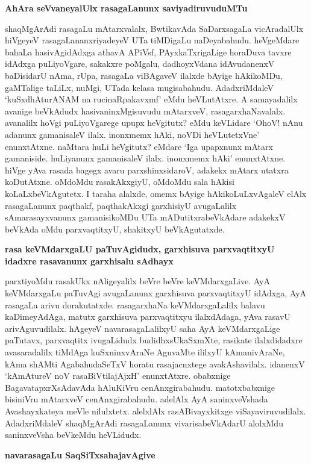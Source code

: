 \noindent
{\bf\large{AhAra seVvaneyalUlx rasagaLanunx saviyadiruvuduMTu}}\label{page221}

shaqMgArAdi rasagaLu mAtarxvalalx, BwtikavAda SaDarxsagaLa vicAradalUlx hiVgeyeV rasagaLananxriyadeyeV UTa tiMDigaLu naDeyabahudu. heVgeMdare bahaLa hasivAgidAdxga athavA APiVsf, PAyxkaTxrigaLige horaDuva tavxre idAdxga puLiyoVgare, sakakxre poMgalu, dadhoyxVdana idAvudanenxV baDisidarU nAma, rUpa, rasagaLa viBAgaveV ilalxde bAyige hAkikoMDu, gaMTalige taLiLx, nuMgi, UTada kelasa mugisabahudu. AdadxriMdaleV `kuSxdhAturANAM na rucinaRpakavxmf'\label{221} eMdu heVLutAtxre. A samayadalilx avanige beVkAdudx hasivaninxMgisuvudu mAtarxveV, rasagarxhaNavalalx. avanalilx hoVgi puLiyoVgarege upupx heVgitutx? eMdu keVLidare `OhoV! nAnu adanunx gamanisaleV ilalx. inonxmemx hAki, noVDi heVLutetxVne' enunxtAtxne. naMtara huLi heVgitutx? eMdare `Iga upapxnunx mAtarx gamaniside. huLiyanunx gamanisaleV ilalx. inonxmemx hAki' enunxtAtxne. hiVge yAva rasada bagegx avaru parxshinxsidaroV, adakekx mAtarx utatxra koDutAtxne. oMdoMdu rasakAkxgiyU, oMdoMdu sala hAkisi koLaLxbeVkAgutetx. I taraha alalxde, omemx bAyige hAkikoLuLxvAgaleV elAlx rasagaLanunx paqthakf, paqthakAkxgi garxhisiyU avugaLalilx sAmarasayxvanunx gamanisikoMDu UTa mADutitxrabeVkAdare adakekxV beVkAda oMdu parxvaqtitxyU, shakitxyU beVkAgutatxde.

\noindent
{\bf\large{rasa keVMdarxgaLU paTuvAgidudx, garxhisuva parxvaqtitxyU idadxre rasavanunx garxhisalu sAdhayx}}\label{page222}

parxtiyoMdu rasakUkx nAligeyalilx beVre beVre keVMdarxgaLive. AyA keVMdarxgaLu paTuvAgi avugaLanunx garxhisuva parxvaqtitxyU idAdxga, AyA rasagaLa arivu dorakutatxde. rasagarxhaNa keVMdarxgaLalilx balavu kaDimeyAdAga, matutx garxhisuva parxvaqtitxyu ilalxdAdaga, yAva rasavU arivAguvudilalx. hAgeyeV navarasagaLalilxyU saha AyA keVMdarxgaLige paTutavx, parxvaqtitx ivugaLidudx budidhxsUkaSxmXte, rasikate ilalxdidadxre avasaradalilx tiMdAga kuSxninxvAraNe AguvaMte ililxyU kAmanivAraNe, kAma shAMti AgabahudaSeTxV horatu rasajacnxtege avakAshavilalx. idanenxV `kAmAtureV noV rasaBiVtilajAjxH'\label{222} enunxtAtxre. obabxnige BagavatapxrXsAdavAda hAluKiVru cenAnxgirabahudu. matotxbabxnige bisiniVru mAtarxveV cenAnxgirabahudu. adelAlx AyA saninxveVshada Avashayxkateya meVle nilulxtetx. alelxlAlx rasABivayxkitxge viSayaviruvudilalx. AdadxriMdaleV shaqMgArAdi rasagaLanunx vivarisabeVkAdarU alolxMdu saninxveVsha beVkeMdu heVLidudx.

\noindent
{\bf\large{navarasagaLu SaqSiTxsahajavAgive}}\label{page222}

